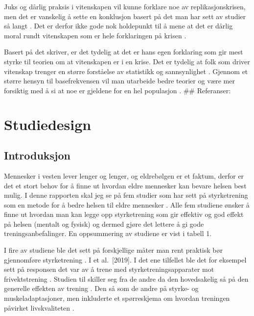\documentclass[
]{book}
\begin{document}
Juks og dårlig praksis i vitenskapen vil kunne forklare noe av
replikasjonskrisen, men det er vanskelig å sette en konklusjon basert på
det man har sett av studier så langt \citep{bird2020}. Det er derfor ikke
gode nok holdepunkt til å mene at det er dårlig moral rundt vitenskapen
som er hele forklaringen på krisen \citep{bird2020}.

Basert på det \citet{bird2020} skriver, er det tydelig at det er hans egen
forklaring som gir mest styrke til teorien om at vitenskapen er i en
krise. Det er tydelig at folk som driver vitenskap trenger en større
forståelse av statistikk og sannsynlighet \citep{bird2020}. Gjennom et større
hensyn til basefrekvensen vil man utarbeide bedre teorier og være mer
forsiktig med å si at noe er gjeldene for en hel populasjon \citep{bird2020}.
\#\# Referanser:

\hypertarget{studiedesign}{%
\chapter{Studiedesign}\label{studiedesign}}

\hypertarget{introduksjon-1}{%
\section{Introduksjon}\label{introduksjon-1}}

Mennesker i vesten lever lenger og lenger, og eldrebølgen er et faktum, derfor er det et stort behov for å finne ut hvordan eldre mennesker kan bevare helsen best mulig.
I denne rapporten skal jeg se på fem studier som har sett på styrketrening som en metode for å bedre helsen til eldre mennesker \citetext{\citealp[ et al.~2012]{Geirsdottir}; \citealp[Johnen, and Holfelder 2019]{Schott}; \citealp[ et al.~2017]{Turpela}; \citealp[ et al.~2019]{vikberg}; \citealp[ et al.~2002]{vincent}}.
Alle fem studiene ønsker å finne ut hvordan man kan legge opp styrketrening som gir effektiv og god effekt på helsen (mentalt og fysisk) og dermed gjøre det lettere å gi gode treningsanbefalinger.
En oppsummering av studiene er vist i tabell 1.

I fire av studiene ble det sett på forskjellige måter man rent praktisk bør gjennomføre styrketrening \citetext{\citealp[Johnen, and Holfelder 2019]{Schott}; \citealp[ et al.~2017]{Turpela}; \citealp[ et al.~2019]{vikberg}; \citealp[ et al.~2002]{vincent}}.
I \citet{Schott} et al.~{[}2019{]}.
I det ene tilfellet ble det for eksempel sett på responsen det var av å trene med styrketreningsapparater mot frivektstrening \citep[ et al 2019]{Schott}.
Studien til \citet{Geirsdottir} skiller seg fra de andre da den hovedsakelig så på den generelle effekten av trening \citep[ et al.~2012]{Geirsdottir}.
Den så som de andre på styrke- og muskeladaptasjoner, men inkluderte et spørreskjema om hvordan treningen påvirket livskvaliteten \citep[ et al.~2012]{Geirsdottir}.
\end{document}

